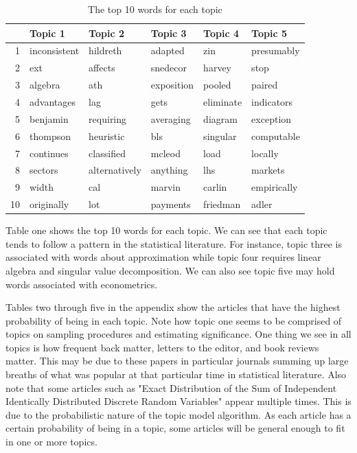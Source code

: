\documentclass{article}%
\theoremstyle{definition}
\begin{document}
\begin{table}[!ht]
\centering
\caption{The top 10 words for each topic}
\begin{tabular}{rlllll}
  \hline
 & Topic 1 & Topic 2 & Topic 3 & Topic 4 & Topic 5 \\ 
  \hline
1 & inconsistent & hildreth & adapted & zin & presumably \\ 
  2 & ext & affects & snedecor & harvey & stop \\ 
  3 & algebra & ath & exposition & pooled & paired \\ 
  4 & advantages & lag & gets & eliminate & indicators \\ 
  5 & benjamin & requiring & averaging & diagram & exception \\ 
  6 & thompson & heuristic & bls & singular & computable \\ 
  7 & continues & classified & mcleod & load & locally \\ 
  8 & sectors & alternatively & anything & lhs & markets \\ 
  9 & width & cal & marvin & carlin & empirically \\ 
  10 & originally & lot & payments & friedman & adler \\ 
   \hline
\end{tabular}
\end{table}

Table one shows the top 10 words for each topic. We can see that each topic tends to follow a pattern in the statistical literature. For instance, topic three is associated with words about approximation while topic four requires linear algebra and singular value decomposition. We can also see topic five may hold words associated with econometrics.

Tables two through five in the appendix show the articles that have the highest probability of being in each topic. Note how topic one seems to be comprised of topics on sampling procedures and estimating significance. One thing we see in all topics is how frequent back matter, letters to the editor, and book reviews matter. This may be due to these papers in particular journals summing up large breaths of what was popular at that particular time in statistical literature. Also note that some articles such as "Exact Distribution of the Sum of Independent Identically Distributed Discrete Random Variables" appear multiple times. This is due to the probabilistic nature of the topic model algorithm. As each article has a certain probability of being in a topic, some articles will be general enough to fit in one or more topics.
\end{document}
